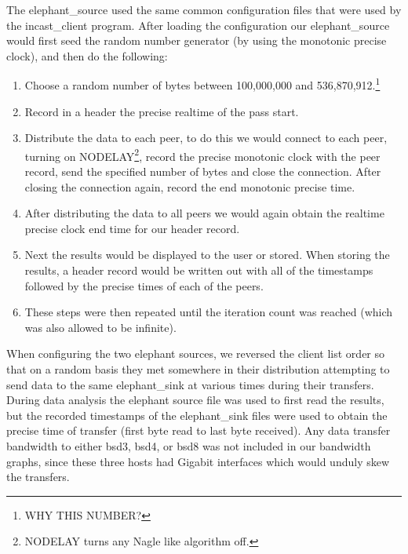 \documentclass[12pt]{article}
\begin{document}
The elephant\_source used the same common configuration files that were used by the incast\_client program.
After loading the configuration our elephant\_source would first
seed the random number generator (by using the monotonic precise clock), and then
do the following:

\begin{enumerate}

\item Choose a random number of bytes between 100,000,000 and
  536,870,912.\footnote{WHY THIS NUMBER?}

\item Record in a header the precise realtime of the pass start.

\item Distribute the data to each peer, to do this we would connect to each peer, turning on 
NODELAY\footnote{NODELAY turns any Nagle\cite{rfc896} like algorithm off.}, record the
precise monotonic clock with the peer record, send the specified number of bytes
and close the connection. After closing the connection again, record the end monotonic 
precise time.

\item After distributing the data to all peers we would again obtain the realtime precise
clock end time for our header record.


\item Next the results would be displayed to the user or stored. When storing the
results, a header record would be written out with all of the timestamps followed
by the precise times of each of the peers.

\item These steps were then repeated until the iteration count was reached (which was
also allowed to be infinite).

\end{enumerate}

When configuring the two elephant sources, we reversed the client list order so that on a random
basis they met somewhere in their distribution attempting to send data to the same elephant\_sink at various
times during their transfers. During data analysis the elephant source file was used to first read the results, but the 
recorded timestamps of the elephant\_sink files were used to obtain the precise time of transfer (first byte
read to last byte received). Any data transfer bandwidth to either bsd3, bsd4, or bsd8 was not included in
our bandwidth graphs, since these three hosts had Gigabit interfaces which would unduly skew the
transfers.
\end{document}
